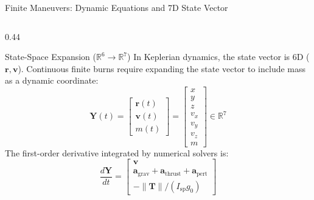 \documentclass[aspectratio=169, 10pt]{beamer}
\begin{document}
\begin{frame}{Finite Maneuvers: Dynamic Equations and 7D State Vector}
\begin{columns}[T]
        \begin{column}{0.44\textwidth}
            \begin{exampleblock}{State-Space Expansion ($\mathbb{R}^6 \to \mathbb{R}^7$)}
                \scriptsize
                In Keplerian dynamics, the state vector is 6D ($\mathbf{r}, \mathbf{v}$). Continuous finite burns require expanding the state vector to include mass as a dynamic coordinate:
                \begin{equation}
                    \mathbf{Y}(t) = \begin{bmatrix} \mathbf{r}(t) \\ \mathbf{v}(t) \\ m(t) \end{bmatrix} = \begin{bmatrix} x \\ y \\ z \\ v_x \\ v_y \\ v_z \\ m \end{bmatrix} \in \mathbb{R}^7
                \end{equation}
                The first-order derivative integrated by numerical solvers is:
                \begin{equation}
                    \frac{d\mathbf{Y}}{dt} = \begin{bmatrix} \mathbf{v} \\ \mathbf{a}_{\text{grav}} + \mathbf{a}_{\text{thrust}} + \mathbf{a}_{\text{pert}} \\ -\|\mathbf{T}\| / (I_{\text{sp}} g_0) \end{bmatrix}
                \end{equation}
            \end{exampleblock}
        \end{column}
    \end{columns}
\end{frame}
\end{document}

